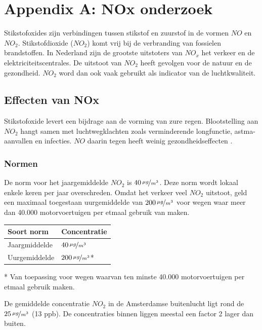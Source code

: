 \documentclass[a4paper, 11pt]{article} %
\begin{document}
	\section{Appendix A: NOx onderzoek}
	Stikstofoxides zijn verbindingen tussen stikstof en zuurstof in de vormen $NO$ en $NO_2$. Stikstofdioxide ($NO_2$) komt vrij bij de verbranding van fossielen brandstoffen. In Nederland zijn de grootste uitstoters van $NO_x$ het verkeer en de elektriciteitscentrales.  De uitstoot van $NO_2$ heeft gevolgen voor de natuur en de gezondheid. $NO_2$ word dan ook vaak gebruikt als indicator van de luchtkwaliteit.
	
	\subsection{Effecten van NOx}
	Stikstofoxide levert een bijdrage aan de vorming van zure regen. Blootstelling aan $NO_2$ hangt samen met luchtwegklachten zoals verminderende longfunctie, astma-aanvallen en infecties. $NO$ daarin tegen heeft weinig gezondheidseffecten \cite{NO2_Amsterdam}. 
	
	
	\subsubsection{Normen}
	De norm voor het jaargemiddelde $NO_2$ is 	$40\,\nicefrac{\mu g}{m^{3}}$. Deze norm wordt lokaal enkele keren per jaar overschreden. Omdat het verkeer veel $NO_2$ uitstoot, geld een maximaal toegestaan uurgemiddelde van $200\,\nicefrac{\mu g}{m^{3}}$ voor wegen waar meer dan 40.000 motorvoertuigen per etmaal gebruik van maken.
	
	\begin{center}
		\begin{tabular}{ | m{5cm} | m{5cm}| } 
			\hline
			Soort norm & Concentratie \\
			\hline
			Jaargmiddelde & $40\,\nicefrac{\mu g}{m^{3}}$
			\\ 
			\hline
			Uurgemiddelde & $200\,\nicefrac{\mu g}{m^{3}}$* 
			\\ 
			\hline
		\end{tabular}
	\end{center}
	
	\begin{footnotesize} 
		* Van toepassing voor wegen waarvan ten minste 40.000 motorvoertuigen per etmaal gebruik maken.
	\end{footnotesize}
	
	De gemiddelde concentratie $NO_2$ in de Amsterdamse buitenlucht ligt rond de $25\,\nicefrac{\mu g}{m^{3}}$ (13 ppb). De concentraties binnen liggen meestal een factor 2 lager dan buiten. 
	
\end{document}
